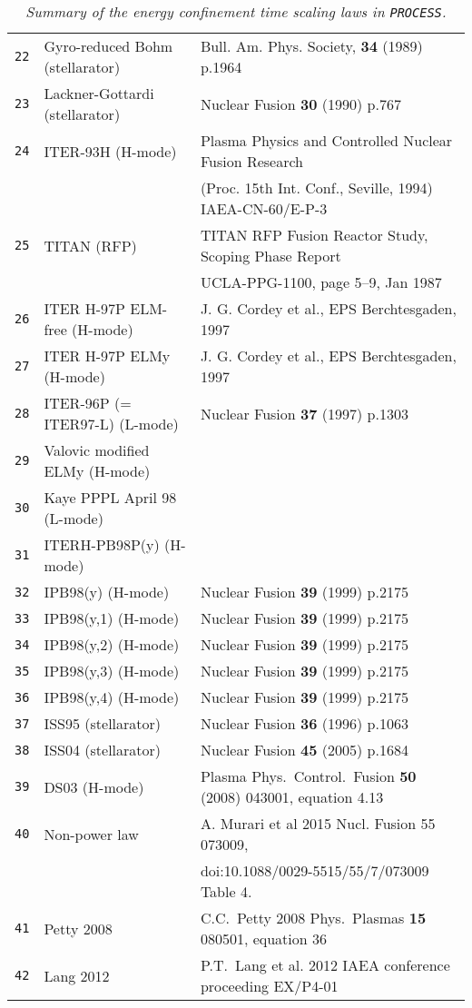 \documentclass[11pt,a4paper]{report}
\newcommand{\process}{\mbox{\texttt{PROCESS}}}
\begin{document}
\begin{table}[tbph]
\begin{center}
\begin{tabular}{||c||l|l||}
\texttt{22} & Gyro-reduced Bohm (stellarator) & Bull. Am. Phys. Society, \textbf{34}
(1989) p.1964 \\
\texttt{23} & Lackner-Gottardi (stellarator) & Nuclear Fusion \textbf{30} (1990) p.767 \\
\texttt{24} & ITER-93H (H-mode) & Plasma Physics and Controlled Nuclear Fusion Research \\
 & & (Proc. 15th Int. Conf., Seville, 1994) IAEA-CN-60/E-P-3 \\
\texttt{25} & TITAN (RFP) & TITAN RFP Fusion Reactor Study, Scoping Phase Report \\
 & & UCLA-PPG-1100, page 5--9, Jan 1987 \\
\texttt{26} & ITER H-97P ELM-free (H-mode) & J. G. Cordey et al., EPS Berchtesgaden, 1997 \\
\texttt{27} & ITER H-97P ELMy (H-mode) & J. G. Cordey et al., EPS Berchtesgaden, 1997 \\
\texttt{28} & ITER-96P (= ITER97-L) (L-mode) & Nuclear Fusion \textbf{37} (1997) p.1303 \\
\texttt{29} & Valovic modified ELMy (H-mode) &  \\
\texttt{30} & Kaye PPPL April 98 (L-mode) &  \\
\texttt{31} & ITERH-PB98P(y) (H-mode) &  \\
\texttt{32} & IPB98(y) (H-mode) & Nuclear Fusion \textbf{39} (1999) p.2175 \\
\texttt{33} & IPB98(y,1) (H-mode) & Nuclear Fusion \textbf{39} (1999) p.2175 \\
\texttt{34} & IPB98(y,2) (H-mode) & Nuclear Fusion \textbf{39} (1999) p.2175 \\
\texttt{35} & IPB98(y,3) (H-mode) & Nuclear Fusion \textbf{39} (1999) p.2175 \\
\texttt{36} & IPB98(y,4) (H-mode) & Nuclear Fusion \textbf{39} (1999) p.2175 \\
\texttt{37} & ISS95 (stellarator) & Nuclear Fusion \textbf{36} (1996) p.1063 \\
\texttt{38} & ISS04 (stellarator) & Nuclear Fusion \textbf{45} (2005) p.1684 \\
\texttt{39} & DS03 (H-mode) & Plasma Phys.\ Control.\ Fusion \textbf{50} (2008) 043001, equation 4.13 \\
\texttt{40} & Non-power law & A. Murari et al 2015 Nucl. Fusion 55 073009, \\
 & & doi:10.1088/0029-5515/55/7/073009  Table 4. \\
\texttt{41} & Petty 2008 &  C.C.~Petty 2008 Phys.\ Plasmas \textbf{15} 080501, equation 36\\
\texttt{42} & Lang 2012 & P.T.~Lang et al. 2012 IAEA conference proceeding EX/P4-01\\
\hline
\end{tabular}
\normalsize
\end{center}
\caption[List of available energy confinement scaling laws]
{\label{tab:scaling_laws}
  \textit{Summary of the energy confinement time scaling laws in \process.}
}
\end{table}
\end{document}
